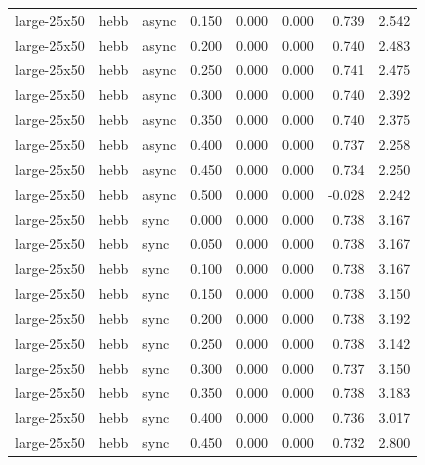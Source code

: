 \begin{tabular}{lllrrrrr}
large-25x50 & hebb & async & 0.150 & 0.000 & 0.000 & 0.739 & 2.542 \\

large-25x50 & hebb & async & 0.200 & 0.000 & 0.000 & 0.740 & 2.483 \\

large-25x50 & hebb & async & 0.250 & 0.000 & 0.000 & 0.741 & 2.475 \\

large-25x50 & hebb & async & 0.300 & 0.000 & 0.000 & 0.740 & 2.392 \\

large-25x50 & hebb & async & 0.350 & 0.000 & 0.000 & 0.740 & 2.375 \\

large-25x50 & hebb & async & 0.400 & 0.000 & 0.000 & 0.737 & 2.258 \\

large-25x50 & hebb & async & 0.450 & 0.000 & 0.000 & 0.734 & 2.250 \\

large-25x50 & hebb & async & 0.500 & 0.000 & 0.000 & -0.028 & 2.242 \\

large-25x50 & hebb & sync & 0.000 & 0.000 & 0.000 & 0.738 & 3.167 \\

large-25x50 & hebb & sync & 0.050 & 0.000 & 0.000 & 0.738 & 3.167 \\

large-25x50 & hebb & sync & 0.100 & 0.000 & 0.000 & 0.738 & 3.167 \\

large-25x50 & hebb & sync & 0.150 & 0.000 & 0.000 & 0.738 & 3.150 \\

large-25x50 & hebb & sync & 0.200 & 0.000 & 0.000 & 0.738 & 3.192 \\

large-25x50 & hebb & sync & 0.250 & 0.000 & 0.000 & 0.738 & 3.142 \\

large-25x50 & hebb & sync & 0.300 & 0.000 & 0.000 & 0.737 & 3.150 \\

large-25x50 & hebb & sync & 0.350 & 0.000 & 0.000 & 0.738 & 3.183 \\

large-25x50 & hebb & sync & 0.400 & 0.000 & 0.000 & 0.736 & 3.017 \\

large-25x50 & hebb & sync & 0.450 & 0.000 & 0.000 & 0.732 & 2.800 \\


\end{tabular}
